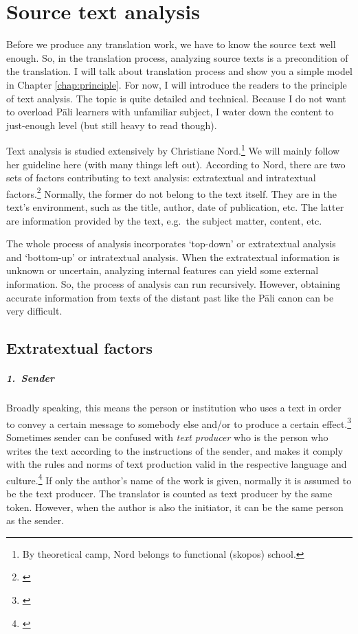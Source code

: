 \chapter{Source text analysis}\label{chap:analysis}

Before we produce any translation work, we have to know the source text well enough. So, in the translation process, analyzing source texts is a precondition of the translation. I will talk about translation process and show you a simple model in Chapter \ref{chap:principle}. For now, I will introduce the readers to the principle of text analysis. The topic is quite detailed and technical. Because I do not want to overload P\=ali learners with unfamiliar subject, I water down the content to just-enough level (but still heavy to read though).

Text analysis is studied extensively by Christiane Nord.\footnote{By theoretical camp, Nord belongs to functional (skopos) school.} We will mainly follow her guideline here (with many things left out). According to Nord, there are two sets of factors contributing to text analysis: extratextual and intratextual factors.\footnote{\citealp[p.~41]{nord:analysis}} Normally, the former do not belong to the text itself. They are in the text's environment, such as the title, author, date of publication, etc. The latter are information provided by the text, e.g.\ the subject matter, content, etc.

The whole process of analysis incorporates `top-down' or extratextual analysis and `bottom-up' or intratextual analysis. When the extratextual information is unknown or uncertain, analyzing internal features can yield some external information. So, the process of analysis can run recursively. However, obtaining accurate information from texts of the distant past like the P\=ali canon can be very difficult.

{}
\section*{Extratextual factors}

\paragraph*{1.\ Sender} Broadly speaking, this means the person or institution who uses a text in order to convey a certain message to somebody else and/or to produce a certain effect.\footnote{\citealp[p.~48]{nord:analysis}} Sometimes sender can be confused with \emph{text producer} who is the person who writes the text according to the instructions of the sender, and makes it comply with the rules and norms of text production valid in the respective language and culture.\footnote{\citealp[p.~48]{nord:analysis}} If only the author's name of the work is given, normally it is assumed to be the text producer. The translator is counted as text producer by the same token. However, when the author is also the initiator, it can be the same person as the sender.

